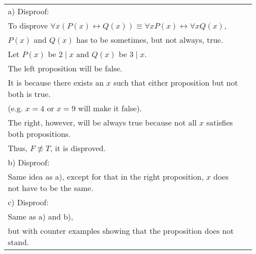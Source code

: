 \documentclass[12pt]{exam}
\begin{document}
\begin{solution}
\begin{tabular}{ll}
 a) Disproof:\\
 To disprove $\forall x(P(x) \leftrightarrow Q(x)) \equiv \forall x P(x) \leftrightarrow \forall x Q(x)$,\\
 $P(x)$ and $Q(x)$ has to be sometimes, but not always, true.\\
 Let $P(x)$ be $2 \mid x$ and $Q(x)$ be $3 \mid x$.\\
 The left proposition will be false.\\
 It is because there exists an $x$ such that either proposition but not both is true.\\
 (e.g. $x=4$ or $x=9$ will make it false).\\
 The right, however, will be always true because not all $x$ satisfies both propositions.\\
 Thus, $F \not \equiv T$, it is disproved.\\
 b) Disproof:\\
 Same idea as a), except for that in the right proposition, $x$ does not have to be the same.\\
 c) Disproof:\\
 Same as a) and b),\\
 but with counter examples showing that the proposition does not stand.
\end{tabular}
\end{solution}
\end{document}
